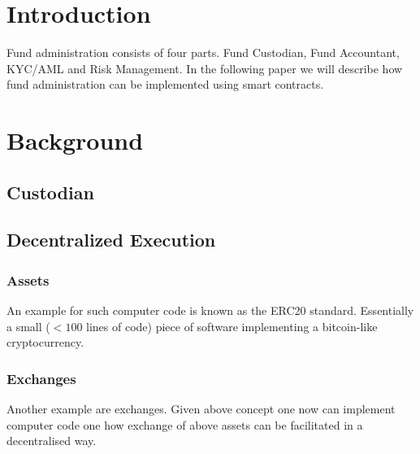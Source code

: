 \documentclass[conference]{IEEEtran}
\begin{document}




%
\IEEEpeerreviewmaketitle



\section{Introduction}

Fund administration consists of four parts. Fund Custodian, Fund Accountant, KYC/AML and Risk Management. In the following paper we will describe how fund administration can be implemented using smart contracts.

\section{Background}

\subsection{Custodian}

\subsection{Decentralized Execution}

\subsubsection{Assets}

An example for such computer code is known as the ERC20 standard. Essentially a small ($<100$ lines of code) piece of software implementing a bitcoin-like cryptocurrency.

\subsubsection{Exchanges}

Another example are exchanges. Given above concept one now can implement computer code one how exchange of above assets can be facilitated in a decentralised way.
\end{document}
